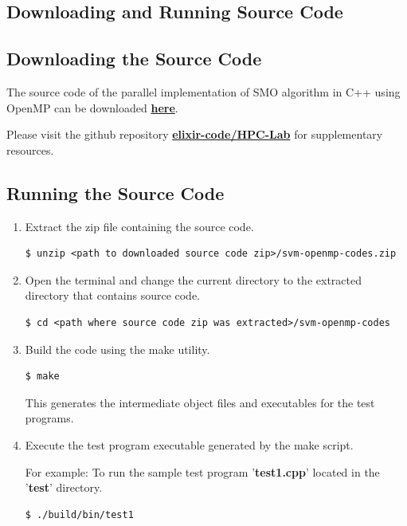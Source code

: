 \documentclass{article}
\begin{document}
\begin{appendices}
	\section{Downloading and Running Source Code}
		\subsection{Downloading the Source Code}
			The source code of the parallel implementation of SMO algorithm in C++ using OpenMP can be downloaded \href{https://github.com/elixir-code/HPC-Lab/raw/master/Project/SVM-OpenMP/svm-openmp-codes.zip}{\textbf{here}}. 
			
			Please visit the github repository \href{https://github.com/elixir-code/HPC-Lab/}{\textbf{elixir-code/HPC-Lab}} for supplementary resources.
			
		\subsection{Running the Source Code}
			\begin{enumerate}
				\item Extract the zip file containing the source code.				
					\begin{lstlisting}[style=BashStyle]
$ unzip <path to downloaded source code zip>/svm-openmp-codes.zip
					\end{lstlisting}
				
				\item Open the terminal and change the current directory to the extracted directory that contains source code.
					\begin{lstlisting}[style=BashStyle]
$ cd <path where source code zip was extracted>/svm-openmp-codes
					\end{lstlisting}
			
				\item Build the code using the make utility.
				\begin{lstlisting}[style=BashStyle]
$ make
			\end{lstlisting}
				
				This generates the intermediate object files and executables for the test programs.
				
				\item Execute the test program executable generated by the make script.
				
					For example: To run the sample test program '\textbf{test1.cpp}' located in the '\textbf{test}' directory.
					\begin{lstlisting}[style=BashStyle]
$ ./build/bin/test1
					\end{lstlisting}
					

\end{enumerate}
\end{appendices}
\end{document}
